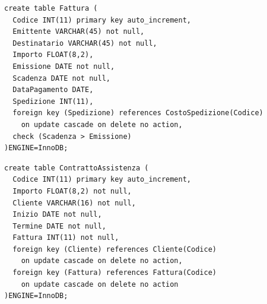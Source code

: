 \noindent{}
\newline\newline

\begin{verbatim}
create table Fattura (
  Codice INT(11) primary key auto_increment,
  Emittente VARCHAR(45) not null,
  Destinatario VARCHAR(45) not null,
  Importo FLOAT(8,2),
  Emissione DATE not null,
  Scadenza DATE not null,
  DataPagamento DATE,
  Spedizione INT(11),
  foreign key (Spedizione) references CostoSpedizione(Codice)
    on update cascade on delete no action,
  check (Scadenza > Emissione)
)ENGINE=InnoDB;
\end{verbatim}
\vspace{0.5cm}

\noindent{}
\newline\newline

\begin{verbatim}
create table ContrattoAssistenza (
  Codice INT(11) primary key auto_increment,
  Importo FLOAT(8,2) not null,
  Cliente VARCHAR(16) not null,
  Inizio DATE not null,
  Termine DATE not null,
  Fattura INT(11) not null,
  foreign key (Cliente) references Cliente(Codice)
    on update cascade on delete no action,
  foreign key (Fattura) references Fattura(Codice)
    on update cascade on delete no action
)ENGINE=InnoDB;
\end{verbatim}
\vspace{0.5cm}

